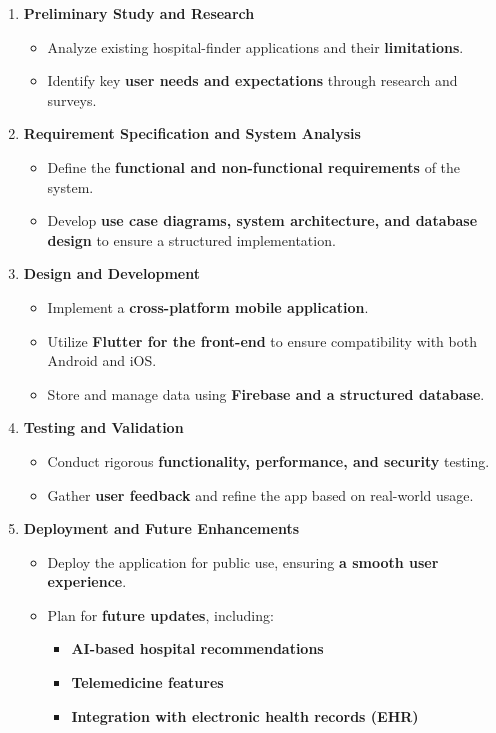 \documentclass[12pt]{report}
\begin{document}
\begin{enumerate}
    \item \textbf{Preliminary Study and Research}
    \begin{itemize}
        \item Analyze existing hospital-finder applications and their \textbf{limitations}.
        \item Identify key \textbf{user needs and expectations} through research and surveys.
    \end{itemize}

    \item \textbf{Requirement Specification and System Analysis}
    \begin{itemize}
        \item Define the \textbf{functional and non-functional requirements} of the system.
        \item Develop \textbf{use case diagrams, system architecture, and database design} to ensure a structured implementation.
    \end{itemize}

    \item \textbf{Design and Development}
    \begin{itemize}
        \item Implement a \textbf{cross-platform mobile application}.
        \item Utilize \textbf{Flutter for the front-end} to ensure compatibility with both Android and iOS.
        \item Store and manage data using \textbf{Firebase and a structured database}.
    \end{itemize}

    \item \textbf{Testing and Validation}
    \begin{itemize}
        \item Conduct rigorous \textbf{functionality, performance, and security} testing.
        \item Gather \textbf{user feedback} and refine the app based on real-world usage.
    \end{itemize}

    \item \textbf{Deployment and Future Enhancements}
    \begin{itemize}
        \item Deploy the application for public use, ensuring \textbf{a smooth user experience}.
        \item Plan for \textbf{future updates}, including:
        \begin{itemize}
            \item \textbf{AI-based hospital recommendations}
            \item \textbf{Telemedicine features}
            \item \textbf{Integration with electronic health records (EHR)}
        \end{itemize}
    \end{itemize}
\end{enumerate}
\end{document}
